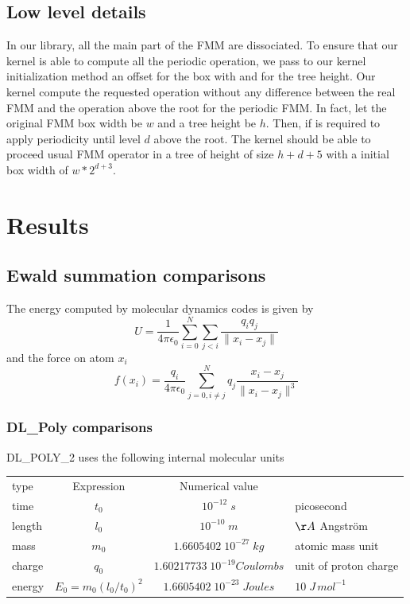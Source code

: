 \documentclass[12pt]{article} %
\begin{document}
\subsection{Low level details}

In our library, all the main part of the FMM are dissociated.
To ensure that our kernel is able to compute all the periodic operation, we pass to our kernel initialization method an offset for the box with and
for the tree height.
Our kernel compute the requested operation without any difference between the real FMM and the operation above the root for the periodic FMM.
In fact, let the original FMM box width be $w$ and a tree height be $h$.
Then, if is required to apply periodicity until level $d$ above the root.
The kernel should be able to proceed usual FMM operator in a tree of height of size $h+d+5$ with a initial box width of $w*2^{d+3}$.

\section{Results}
\subsection{Ewald summation comparisons}

The energy computed by molecular dynamics codes is given by
$$
U = \frac{1}{4 \pi\epsilon_0}\sum_{i=0}^{N}{\sum_{j<i}{\frac{q_i q_j}{\|x_i-x_j\|}}}
$$ 
and the force on atom $x_i$
$$
f(x_i) =  \frac{q_i }{4 \pi\epsilon_0}\sum_{j=0,i\neq j}^{N}{q_j\frac{x_i-x_j}{\|x_i-x_j\|^3}}
$$
\subsubsection{DL\_Poly comparisons}
DL\_POLY\_2 uses the following internal molecular units \\

\begin{tabular}{|l|c|c|l|}
\hline
type & Expression & Numerical value & \\
time &$t_0$ & $10^{-12}\;s$& picosecond\\
length & $l_0$ &$10^{-10}\; m $& $\AA$ Angström\\
mass &  $m_0$ & $ 1.6605402 \; 10^{−27}\; kg $& atomic mass unit\\
charge &  $q_0$ & $1.60217733 \; 10^{−19} Coulombs$& unit of proton charge\\
energy & $E_0 = m_0(l_0/t_0)^2$&$1.6605402 \;  10^{−23}\; Joules $ & $10\; J\, mol^{-1}$\\
\hline
\end{tabular}
\end{document}
